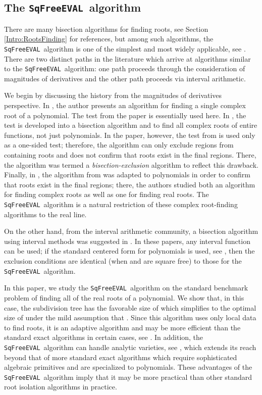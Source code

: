 \documentclass{amsart}
\theoremstyle{definition}
\newcommand{\EVAL}{\texttt{SqFreeEVAL}}
\begin{document}
\subsection{The \EVAL\ algorithm}
There are many bisection algorithms for finding roots, see Section \ref{Intro:RootsFinding} for references, but among such algorithms, the \EVAL\ algorithm is one of the simplest and most widely applicable, see \citep{burr-sharma-yap:eval:09}.  There are two distinct paths in the literature which arrive at algorithms similar to the \EVAL\ algorithm: one path proceeds through the consideration of magnitudes of derivatives and the other path proceeds via interval arithmetic.

We begin by discussing the history from the magnitudes of derivatives perspective.  In \citep{Henrici:search:70}, the author presents an algorithm for finding a single complex root of a polynomial.  The test  from the paper is essentially used here.  In \citep{Yakoubsohn:bisection:05}, the test is developed into a bisection algorithm and to find all complex roots of entire functions, not just polynomials.  In the paper, however, the test from \citep{Henrici:search:70} is used only as a one-sided test; therefore, the algorithm can only exclude regions from containing roots and does not confirm that roots exist in the final regions.  There, the algorithm was termed a {\em bisection-exclusion} algorithm to reflect this drawback.  Finally, in \citep{sagraloff-yap:ceval:09}, the algorithm from \citep{Yakoubsohn:bisection:05} was adapted to polynomials in order to confirm that roots exist in the final regions; there, the authors studied both an algorithm for finding complex roots as well as one for finding real roots.  The \EVAL\ algorithm is a natural restriction of these complex root-finding algorithms to the real line.

On the other hand, from the interval arithmetic community, a bisection algorithm using interval methods was suggested in \citep{moore:bk,mitchell:robust-ray:90}.  In these papers, any interval function can be used; if the standard centered form for polynomials is used, see \citep{ratschek-rokne:range:bk}, then the exclusion conditions are identical (when  and  are square free) to those for the \EVAL\ algorithm.

In this paper, we study the \EVAL\ algorithm on the standard benchmark problem of finding all of the real roots of a polynomial.  We show that, in this case, the subdivision tree has the favorable size of  which simplifies to the optimal size of  under the mild assumption that .  Since this algorithm uses only local data to find roots, it is an adaptive algorithm and may be more efficient than the standard exact algorithms in certain cases, see \citep{burr-sharma-yap:eval:09}.  In addition, the \EVAL\ algorithm can handle analytic varieties, see \citep{burr-sharma-yap:eval:09}, which extends its reach beyond that of more standard exact algorithms which require sophisticated algebraic primitives and are specialized to polynomials.  These advantages of the \EVAL\ algorithm imply that it may be more practical than other standard root isolation algorithms in practice.
\end{document}
